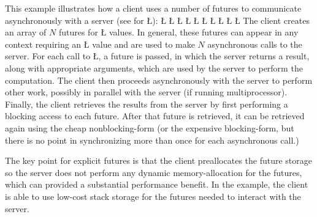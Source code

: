 \documentclass[openright,twoside]{report}
\begin{document}
This example illustrates how a client uses a number of futures to communicate asynchronously with a server (see  for \LGinlinetrue\LGbegin\lgrinde\L{}\endlgrinde\LGend{}):
\LGinlinefalse\LGbegin\lgrinde
\L{}
\CE{}\L{}
\CE{}\L{}
\CE{}\L{\LB{}}
\CE{}\L{\LB{\}}}
\L{}
\CE{}\L{}
\CE{}\L{\LB{}}
\CE{}\L{\LB{}}
\CE{}\L{\LB{\}}}
\endlgrinde\LGend
The client creates an array of $N$ futures for \LGinlinetrue\LGbegin\lgrinde\L{}\endlgrinde\LGend{} values.
In general, these futures can appear in any context requiring an \LGinlinetrue\LGbegin\lgrinde\L{}\endlgrinde\LGend{} value and are used to make $N$ asynchronous calls to the server.
For each call to \LGinlinetrue\LGbegin\lgrinde\L{}\endlgrinde\LGend{}, a future is passed, in which the server returns a result, along with appropriate arguments, which are used by the server to perform the computation.
The client then proceeds asynchronously with the server to perform other work, possibly in parallel with the server (if running multiprocessor).
Finally, the client retrieves the results from the server by first performing a blocking access to each future.
After that future is retrieved, it can be retrieved again using the cheap nonblocking-form (or the expensive blocking-form, but there is no point in synchronizing more than once for each asynchronous call.)

The key point for explicit futures is that the client preallocates the future storage so the server does not perform any dynamic memory-allocation for the futures, which can provided a substantial performance benefit.
In the example, the client is able to use low-cost stack storage for the futures needed to interact with the server.
\end{document}
